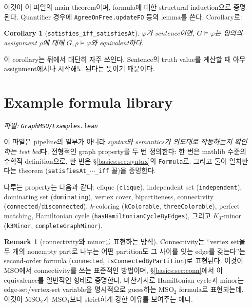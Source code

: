 \documentclass[11pt]{article}
\theoremstyle{definition}
\newtheorem{remark}[definition]{Remark}
\theoremstyle{plain}
\newtheorem{corollary}[definition]{Corollary}
\newcommand{\MSO}{\mathrm{MSO}}
\newcommand{\MSOtwo}{\mathrm{MSO}_2}
\newcommand{\MSOone}{\mathrm{MSO}_1}
\newcommand{\lean}[1]{\texttt{#1}}
\newcommand{\leanfile}[1]{\texttt{#1}}
\begin{document}
이것이 이 파일의 main theorem이며, formula에 대한 structural induction으로
증명된다. Quantifier 경우에 \lean{AgreeOnFree.updateFO} 등의 lemma를 쓴다.
Corollary로:

\begin{corollary}[\lean{satisfies\_iff\_satisfiesAt}]
\label{basics:cor:closedindep}
$\varphi$가 sentence이면, $G \models \varphi$는 \emph{임의의} assignment
$\rho$에 대해 $G, \rho \models \varphi$와 equivalent하다.
\end{corollary}

이 corollary는 뒤에서 대단히 자주 쓰인다. Sentence의 truth value를 계산할 때
아무 assignment에서나 시작해도 된다는 뜻이기 때문이다.

\section{Example formula library}
\label{basics:sec:examples}

\emph{파일: \leanfile{GraphMSO/Examples.lean}}

이 파일은 pipeline의 일부가 아니라 \emph{syntax와 semantics가 의도대로
작동하는지 확인하는 test bed}다. 전형적인 graph property를 두 번 정의한다:
한 번은 mathlib 수준의 수학적 definition으로, 한 번은
\S\ref{basics:sec:syntax}의 \lean{Formula}로. 그리고 둘이 일치한다는
theorem (\lean{satisfiesAt\_$\cdots$\_iff} 꼴)을 증명한다.

다루는 property는 다음과 같다: clique (\lean{clique}), independent set
(\lean{independent}), dominating set (\lean{dominating}), vertex cover,
bipartiteness, connectivity (\lean{connected}/\lean{disconnected}),
$k$-coloring (\lean{kColorable}, \lean{threeColorable}), perfect matching,
Hamiltonian cycle (\lean{hasHamiltonianCycleByEdges}), 그리고 $K_3$-minor
(\lean{k3Minor}, \lean{completeGraphMinor}).

\begin{remark}[connectivity와 minor를 표현하는 방식]
\label{basics:rem:connexample}
Connectivity는 ``vertex set을 두 개의 nonempty part로 나누는 어떤 partition도
그 사이를 잇는 edge를 갖는다''는 second-order formula
(\lean{connected}, \lean{isConnectedByPartition})로 표현된다. 이것이
$\MSO$에서 connectivity를 쓰는 표준적인 방법이며,
\S\ref{basics:sec:conn}에서 이 equivalence를 일반적인 형태로 증명한다.
마찬가지로 Hamiltonian cycle과 minor는 edge-set/vertex-set variable을 명시적으로
guess하는 $\MSOtwo$ formula로 표현되는데, 이것이 $\MSOtwo$가 $\MSOone$보다
strict하게 강한 이유를 보여주는 예다.
\end{remark}
\end{document}
